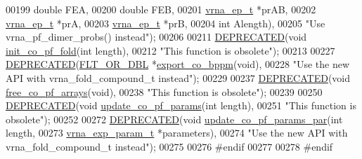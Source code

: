 \begin{DoxyCode}
00199                                       \textcolor{keywordtype}{double}    FEA,
00200                                       \textcolor{keywordtype}{double}    FEB,
00201                                       \mbox{\hyperlink{group__struct__utils_structvrna__elem__prob__s}{vrna\_ep\_t}} *prAB,
00202                                       \mbox{\hyperlink{group__struct__utils_structvrna__elem__prob__s}{vrna\_ep\_t}} *prA,
00203                                       \mbox{\hyperlink{group__struct__utils_structvrna__elem__prob__s}{vrna\_ep\_t}} *prB,
00204                                       \textcolor{keywordtype}{int}       Alength),
00205 \textcolor{stringliteral}{"Use vrna\_pf\_dimer\_probs() instead"});
00206 
00211 \mbox{\hyperlink{part__func__co_8h_aab347a3c03fbe8e7319551b9fa0cce4a}{DEPRECATED}}(\textcolor{keywordtype}{void}   \mbox{\hyperlink{part__func__co_8h_aa12dda9dd6179cdd22bcce87c0682c07}{init\_co\_pf\_fold}}(\textcolor{keywordtype}{int} length),
00212 \textcolor{stringliteral}{"This function is obsolete"});
00213 
00227 \mbox{\hyperlink{part__func__co_8h_aab347a3c03fbe8e7319551b9fa0cce4a}{DEPRECATED}}(\mbox{\hyperlink{group__data__structures_ga31125aeace516926bf7f251f759b6126}{FLT\_OR\_DBL}} *\mbox{\hyperlink{part__func__co_8h_ad94c0133157bed6912fe7fe866e0039e}{export\_co\_bppm}}(\textcolor{keywordtype}{void}),
00228 \textcolor{stringliteral}{"Use the new API with vrna\_fold\_compound\_t instead"});
00229 
00237 \mbox{\hyperlink{part__func__co_8h_aab347a3c03fbe8e7319551b9fa0cce4a}{DEPRECATED}}(\textcolor{keywordtype}{void} \mbox{\hyperlink{part__func__co_8h_ade3ce34ae8214811374b1d28a40dc247}{free\_co\_pf\_arrays}}(\textcolor{keywordtype}{void}),
00238 \textcolor{stringliteral}{"This function is obsolete"});
00239 
00250 \mbox{\hyperlink{part__func__co_8h_aab347a3c03fbe8e7319551b9fa0cce4a}{DEPRECATED}}(\textcolor{keywordtype}{void} \mbox{\hyperlink{part__func__co_8h_a6e0f36c1f9b7d9dd4bfbad914c1119e5}{update\_co\_pf\_params}}(\textcolor{keywordtype}{int} length),
00251 \textcolor{stringliteral}{"This function is obsolete"});
00252 
00272 \mbox{\hyperlink{part__func__co_8h_aab347a3c03fbe8e7319551b9fa0cce4a}{DEPRECATED}}(\textcolor{keywordtype}{void} \mbox{\hyperlink{part__func__co_8h_a75465d7e8793db68a434d83df9a2e794}{update\_co\_pf\_params\_par}}(\textcolor{keywordtype}{int}               length,
00273                                         \mbox{\hyperlink{group__energy__parameters_structvrna__exp__param__s}{vrna\_exp\_param\_t}}  *parameters),
00274 \textcolor{stringliteral}{"Use the new API with vrna\_fold\_compound\_t instead"});
00275 
00276 \textcolor{preprocessor}{#endif}
00277 
00278 \textcolor{preprocessor}{#endif}
\end{DoxyCode}
